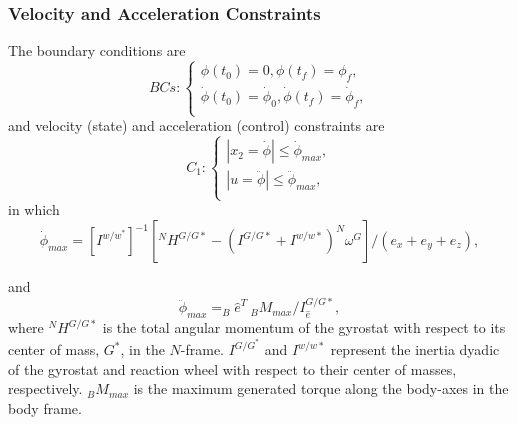 \documentclass[letterpaper, preprint, paper,11pt]{AAS}	%
\begin{document}

		\subsubsection{Velocity and Acceleration Constraints}

			The boundary conditions are
			\begin{equation}\label{Bcs}
				BCs:\left\{
				\begin{array}{l}
				\phi(t_0)=0, \phi(t_f)=\phi_{f},\\
				\dot{\phi}(t_0)=\dot{\phi}_{0},\dot{ \phi}(t_f)=\dot{\phi}_{f}, \\
				\end{array}
				\right.
			\end{equation}
			and velocity (state) and acceleration (control) constraints are
			\begin{equation}\label{constraints1}
				C_1:\left\{
				\begin{array}{l}
				|x_2=\dot{\phi}|\leq \dot{\phi}_{max},\\
				|u=\ddot{\phi}|\leq \ddot{\phi}_{max},\\
				\end{array}
				\right.
			\end{equation}
			in which
			\begin{equation}
				\dot{\phi}_{max}=[I^{w/w^*}]^{-1}[^NH^{G/G*}-(I^{G/G*}+I^{w/w*})^N\omega^G]/(e_x+e_y+e_z),
			\end{equation}


			and
			\begin{equation}\label{phiddotmax}
				\ddot{\phi}_{max}=_B\hat{e}^T\  _BM_{max}/I_{\hat{e}}^{G/G*},
			\end{equation}
			where $^NH^{G/G*}$ is the total angular momentum of the gyrostat with respect to its center of mass, $G^*$, in the $N$-frame. $I^{G/G^*}$ and $I^{w/w*}$ represent the inertia dyadic of the gyrostat and reaction wheel with respect to their center of masses, respectively. $_BM_{max}$ is the maximum generated torque along the body-axes in the body frame. \\
			
\end{document}
